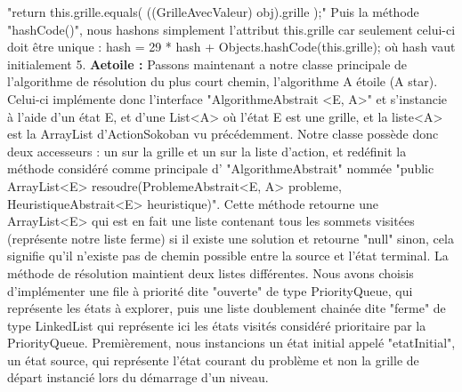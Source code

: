 \documentclass[a4paper,12pt]{article} %
\begin{document}
\newline\newline    
"return this.grille.equals( ((GrilleAvecValeur) obj).grille );"
\newline\newline
Puis la méthode "hashCode()", nous hashons simplement l’attribut this.grille car seulement celui-ci doit être unique : hash = 29 * hash + Objects.hashCode(this.grille); où hash vaut initialement 5.
\newpage
\noindent
\textbf{Aetoile :}
\newline\newline
Passons maintenant a notre classe principale de l’algorithme de résolution du plus court chemin, l’algorithme A étoile (A star).
\newline\newline
Celui-ci implémente donc l’interface "AlgorithmeAbstrait <E, A>" et s’instancie à l’aide d’un état E, et d’une List<A> où l’état E est une grille, et la liste<A> est la ArrayList d’ActionSokoban vu précédemment.
\newline\newline 
Notre classe possède donc deux accesseurs : un sur la grille et un sur la liste d’action, et redéfinit la méthode considéré comme principale d’ "AlgorithmeAbstrait" nommée 
\newline\newline
"public ArrayList<E> resoudre(ProblemeAbstrait<E, A> probleme, HeuristiqueAbstrait<E> heuristique)".
\newline\newline
Cette méthode retourne une ArrayList<E> qui est en fait une liste contenant tous les sommets visitées (représente notre liste ferme) si il existe une solution et retourne "null" sinon, cela signifie qu’il n’existe pas de chemin possible entre la source et l’état terminal.
\newline\newline
La méthode de résolution maintient deux listes différentes.
\newline\newline
Nous avons choisis d’implémenter une file à priorité dite "ouverte" de type PriorityQueue, qui représente les états à explorer, puis une liste doublement chainée dite "ferme" de type LinkedList qui représente ici les états visités considéré prioritaire par la PriorityQueue.
\newline\newline
Premièrement, nous instancions un état initial appelé "etatInitial", un état source, qui représente l’état courant du problème et non la grille de départ instancié lors du démarrage d’un niveau. 
\end{document}
